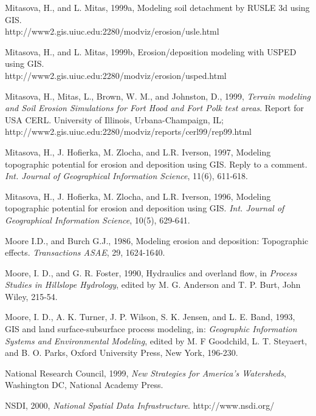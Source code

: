 \documentclass{kapedbk} %
\begin{document}
\begin{chapthebibliography}{1}
{\bibitem{}
Mitasova, H., and L. Mitas, 1999a, Modeling soil detachment by RUSLE 3d using
GIS. \\
http://www2.gis.uiuc.edu:2280/modviz/erosion/usle.html

\bibitem{}
Mitasova, H., and L. Mitas, 1999b, Erosion/deposition modeling with USPED 
using GIS. \\
http://www2.gis.uiuc.edu:2280/modviz/erosion/usped.html

\bibitem{}
Mitasova, H., Mitas, L., Brown, W. M., and Johnston, D., 1999, 
{\it Terrain modeling and Soil
Erosion Simulations for Fort Hood and Fort Polk test areas}. Report for USA CERL.
University of Illinois, Urbana-Champaign, IL; \\
http://www2.gis.uiuc.edu:2280/modviz/reports/cerl99/rep99.html

\bibitem{} 
Mitasova, H., J. Hofierka, M. Zlocha, and L.R. Iverson, 1997,
     Modeling topographic potential for erosion and deposition using
     GIS. Reply to a comment.
   {\it  Int. Journal of Geographical Information Science}, 11(6), 611-618. 

\bibitem{}
Mitasova, H., J. Hofierka, M. Zlocha, and L.R. Iverson, 1996, Modeling 
    topographic potential for erosion and deposition using GIS. 
{\it Int. Journal of Geographical Information Science}, 10(5),
      629-641. 

\bibitem{}
Moore I.D., and Burch G.J., 1986, Modeling erosion and deposition: Topographic effects.
      {\it Transactions ASAE}, 29, 1624-1640. 

\bibitem{}
Moore, I. D., and G. R. Foster, 1990, Hydraulics and overland flow, 
in {\it Process Studies in Hillslope Hydrology}, 
edited by M. G. Anderson and T. P. Burt, John Wiley, 215-54.

\bibitem{}
Moore, I. D.,  A. K. Turner, J. P. Wilson, S. K. Jensen, and L. E. Band, 1993, 
GIS and land surface-subsurface process modeling, 
in: {\it Geographic Information Systems and Environmental Modeling}, 
edited by M. F Goodchild, L. T. Steyaert, and B. O. Parks, 
Oxford University Press, New York, 196-230.

\bibitem{}
National Research Council, 1999, {\it New Strategies for America's Watersheds}, 
Washington DC, National Academy Press.

\bibitem{}
NSDI, 2000, {\it National Spatial Data Infrastructure}. http://www.nsdi.org/


}
\end{chapthebibliography}
\end{document}
